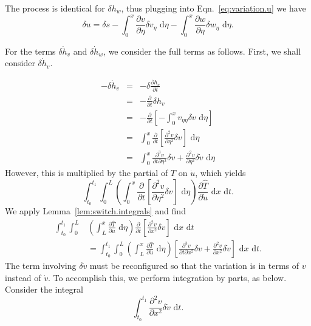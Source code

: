 The process is identical for $\delta h_w$, thus plugging into Eqn.~\ref{eq:variation.u} we have
\begin{equation}
\delta u = \delta s - \int_0^x \frac{\partial v}{\partial \eta}\delta v_{\eta}\text{ d}\eta - \int_0^x \frac{\partial w}{\partial \eta}\delta w_{\eta}\text{ d}\eta.
\label{eq:variation.u.final}
\end{equation}

For the terms $\delta \dot h_v$ and $\delta \dot h_w$, we consider the full terms as follows. First, we shall consider $\delta\dot h_v$.

\begin{eqnarray}
-\delta\dot h_v &=& -\delta \frac{\partial h_v}{\partial t} \\
 &=& -\frac{\partial}{\partial t}\delta h_v\\
 &=& -\frac{\partial}{\partial t}\left[-\int_0^xv_{\eta\eta}\delta v\text{ d}\eta\right] \\
 &=& \int_0^x\frac{\partial}{\partial t}\left[\frac{\partial^2v}{\partial\eta^2}\delta v\right]\text{ d}\eta\\
 &=& \int_0^x\frac{\partial^3 v}{\partial t\partial\eta^2}\delta v+\frac{\partial^2 v}{\partial \eta^2}\delta\dot v\text{ d}\eta
\end{eqnarray}
However, this is multiplied by the partial of $T$ on $\dot u$, which yields
\begin{equation}
\int_{t_0}^{t_1}\int_0^L\left(\int_0^x\frac{\partial}{\partial t}\left[\frac{\partial^2v}{\partial\eta^2}\delta v\right]\text{ d}\eta\right)\frac{\partial \hat T}{\partial \dot u}\text{ d}x\text{ d}t.
\end{equation}
We apply Lemma~\ref{lem:switch.integrals} and find
\begin{align}
 \int_{t_0}^{t_1} \int_0^L & \left(\int_L^x\frac{\partial\hat T}{\partial \dot u}\text{ d}\eta\right)\frac{\partial}{\partial t}\left[\frac{\partial^2v}{\partial x^2}\delta v\right]\text{ d}x\text{ d}t \label{eq:lemma_switch_vdot}\\
&= \int_{t_0}^{t_1}\int_0^L\left(\int_L^x\frac{\partial\hat T}{\partial \dot u}\text{ d}\eta\right)\left[\frac{\partial^3v}{\partial t\partial x^2}\delta v+\frac{\partial^2 v}{\partial x^2}\delta\dot v\right]\text{ d}x\text{ d}t. \nonumber
\end{align}
The term involving $\delta \dot v$ must be reconfigured so that the variation is in terms of $v$ instead of $\dot v$. To accomplish this, we perform integration by parts, as below.
Consider the integral
\begin{equation}
\int_{t_0}^{t_1}\frac{\partial^2 v}{\partial x^2}\delta \dot v\text{ d}t.
\end{equation}
